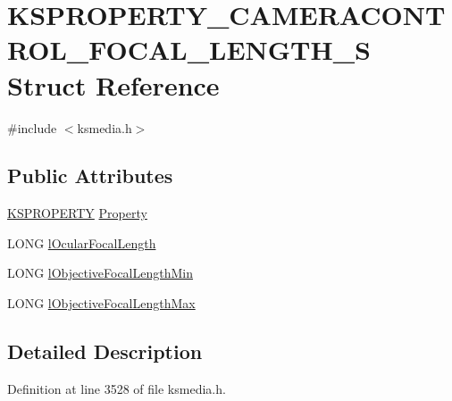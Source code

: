\hypertarget{struct_k_s_p_r_o_p_e_r_t_y___c_a_m_e_r_a_c_o_n_t_r_o_l___f_o_c_a_l___l_e_n_g_t_h___s}{}\section{K\+S\+P\+R\+O\+P\+E\+R\+T\+Y\+\_\+\+C\+A\+M\+E\+R\+A\+C\+O\+N\+T\+R\+O\+L\+\_\+\+F\+O\+C\+A\+L\+\_\+\+L\+E\+N\+G\+T\+H\+\_\+S Struct Reference}
\label{struct_k_s_p_r_o_p_e_r_t_y___c_a_m_e_r_a_c_o_n_t_r_o_l___f_o_c_a_l___l_e_n_g_t_h___s}


{\ttfamily \#include $<$ksmedia.\+h$>$}

\subsection*{Public Attributes}
\begin{DoxyCompactItemize}
\item 
\hyperlink{ks_8h_a4392f77c74e868d813d46c39ada4d660}{K\+S\+P\+R\+O\+P\+E\+R\+TY} \hyperlink{struct_k_s_p_r_o_p_e_r_t_y___c_a_m_e_r_a_c_o_n_t_r_o_l___f_o_c_a_l___l_e_n_g_t_h___s_a9001654834229ebcb257b7d0932409a3}{Property}
\item 
L\+O\+NG \hyperlink{struct_k_s_p_r_o_p_e_r_t_y___c_a_m_e_r_a_c_o_n_t_r_o_l___f_o_c_a_l___l_e_n_g_t_h___s_a92df87301158c35f6fc2c85bb76a6446}{l\+Ocular\+Focal\+Length}
\item 
L\+O\+NG \hyperlink{struct_k_s_p_r_o_p_e_r_t_y___c_a_m_e_r_a_c_o_n_t_r_o_l___f_o_c_a_l___l_e_n_g_t_h___s_a22d8c3a2f7430232d5f90ca64109fbac}{l\+Objective\+Focal\+Length\+Min}
\item 
L\+O\+NG \hyperlink{struct_k_s_p_r_o_p_e_r_t_y___c_a_m_e_r_a_c_o_n_t_r_o_l___f_o_c_a_l___l_e_n_g_t_h___s_a8d5cfeff822c8121feeeb2e7dc096aaf}{l\+Objective\+Focal\+Length\+Max}
\end{DoxyCompactItemize}


\subsection{Detailed Description}


Definition at line 3528 of file ksmedia.\+h.



